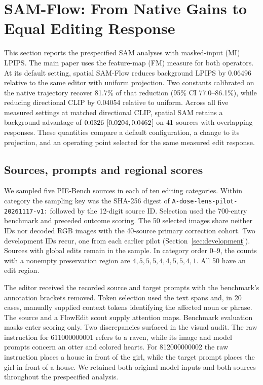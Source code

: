 \section{SAM-Flow: From Native Gains to Equal Editing Response}
\label{sec:sam}
This section reports the prespecified SAM analyses with masked-input (MI) LPIPS. The main paper uses the feature-map (FM) measure for both operators. At its default setting, spatial SAM-Flow reduces background LPIPS by 0.06496 relative to the same editor with uniform projection. Two constants calibrated on the native trajectory recover 81.7\% of that reduction (95\% CI 77.0--86.1\%), while reducing directional CLIP by 0.04054 relative to uniform. Across all five measured settings at matched directional CLIP, spatial SAM retains a background advantage of $0.0326$ [$0.0204,0.0462$] on $41$ sources with overlapping responses. These quantities compare a default configuration, a change to its projection, and an operating point selected for the same measured edit response.

\subsection{Sources, prompts and regional scores}
We sampled five PIE-Bench sources in each of ten editing categories. Within category the sampling key was the SHA-256 digest of \texttt{A-dose-lens-pilot-20261117-v1:} followed by the 12-digit source ID. Selection used the 700-entry benchmark and preceded outcome scoring. The 50 selected images share neither IDs nor decoded RGB images with the 40-source primary correction cohort. Two development IDs recur, one from each earlier pilot (Section~\ref{sec:development}). Sources with global edits remain in the sample. In category order 0--9, the counts with a nonempty preservation region are $4,5,5,5,4,4,5,5,4,1$. All 50 have an edit region.

The editor received the recorded source and target prompts with the benchmark's annotation brackets removed. Token selection used the text spans and, in 20 cases, manually supplied context tokens identifying the affected noun or phrase. The source and a FlowEdit scout supply attention maps. Benchmark evaluation masks enter scoring only. Two discrepancies surfaced in the visual audit. The raw instruction for 611000000001 refers to a raven, while its image and model prompts concern an otter and colored hearts. For 812000000002 the raw instruction places a house in front of the girl, while the target prompt places the girl in front of a house. We retained both original model inputs and both sources throughout the prespecified analysis.

